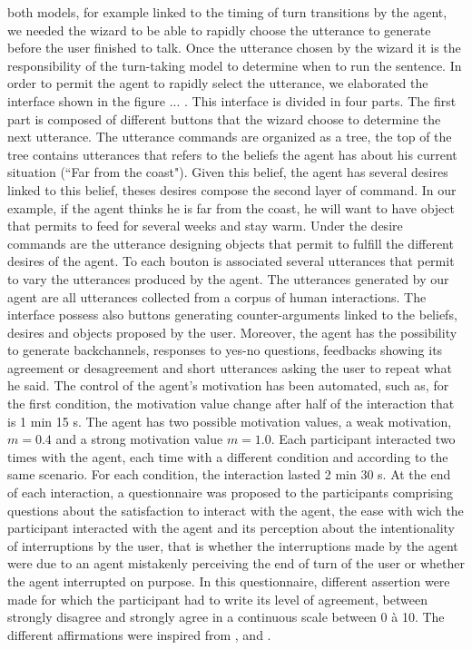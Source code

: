 both models, for example linked to the timing of turn transitions by the agent, we needed the wizard to be able to rapidly choose the utterance to generate before the user finished to talk. Once the utterance chosen by the wizard it is the responsibility of the turn-taking model to determine when to run the sentence. In order to permit the agent to rapidly select the utterance, we elaborated the interface shown in the figure ... .
This interface is divided in four parts. The first part is composed of different buttons that the wizard choose to determine the next utterance. The utterance commands are organized as a tree, the top of the tree contains utterances that refers to the beliefs the agent has about his current situation (``Far from the coast"). Given this belief, the agent has several desires linked to this belief, theses desires compose the second layer of command. In our example, if the agent thinks he is far from the coast, he will want to have object that permits to feed for several weeks and stay warm. Under the desire commands are the utterance designing objects that permit to fulfill the different desires of the agent. To each bouton is associated several utterances that permit to vary the utterances produced by the agent. The utterances generated by our agent are all utterances collected from a corpus of human interactions. 
The interface possess also buttons generating counter-arguments linked to the beliefs, desires and objects proposed by the user. 
Moreover, the agent has the possibility to generate backchannels, responses to yes-no questions, feedbacks showing its agreement or desagreement and short utterances asking the user to repeat what he said.
The control of the agent's motivation has been automated, such as, for the first condition, the motivation value change after half of the interaction that is 1 min 15 s. The agent has two possible motivation values, a weak motivation, $m=0.4$ and a strong motivation value $m=1.0$. Each participant interacted two times with the agent, each time with a different condition and according to the same scenario. For each condition, the interaction lasted 2 min 30 s. At the end of each interaction, a questionnaire was proposed to the participants comprising questions about the satisfaction to interact with the agent, the ease with wich the participant interacted with the agent and its perception about the intentionality of interruptions by the user, that is whether the interruptions made by the agent were due to an agent mistakenly perceiving the end of turn of the user or whether the agent interrupted on purpose. In this questionnaire, different assertion were made for which the participant had to write its level of agreement, between strongly disagree and strongly agree in a continuous scale between 0 à 10. The different affirmations were inspired from \cite{skantze_towards_2010}, \cite{bevacqua_effects_2014} and \cite{de_vault_toward_2015}.

